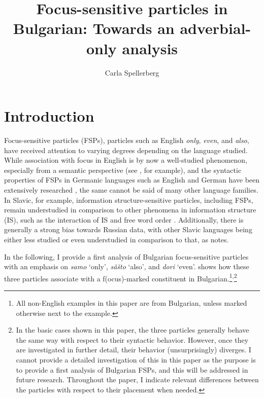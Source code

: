 \documentclass[output=paper,colorlinks,citecolor=brown]{langscibook}
\author{Carla Spellerberg %
\affiliation{University of Massachusetts, Amherst}}
\title[Focus-sensitive particles in Bulgarian]{Focus-sensitive particles in Bulgarian: Towards an adverbial-only analysis}
\begin{document}
\maketitle

%
\section{Introduction}\label{sec:1}
Focus-sensitive particles (FSPs), particles such as English \textit{only}, \textit{even}, and \textit{also}, have received attention to varying degrees depending on the language studied. While association with focus in English is by now a well-studied phenomenon, especially from a semantic perspective (see \citealt{spe:Rooth1985}, for example), and the syntactic properties of FSPs in Germanic languages such as English and German have been extensively researched \citep{Jacobs1983,BuringHartmann2001,vonStechow2008,Mursell2021}, the same cannot be said of many other language families. In Slavic, for example, information structure-sensitive particles, including FSPs, remain understudied in comparison to other phenomena in information structure (IS), such as the interaction of IS and free word order \citep[731]{Jasinskaja2016}. Additionally, there is generally a strong bias towards Russian data, with other Slavic languages being either less studied or even understudied in comparison to that, as \citet{Jasinskaja2016} notes. \par 
In the following, I provide a first analysis of Bulgarian focus-sensitive particles with an emphasis on \textit{samo} `only’, \textit{s\v{a}\v{s}to} `also’, and \textit{dori} `even’.  shows how these three particles associate with a f(ocus)-marked constituent in Bulgarian.\footnote{All non-English examples in this paper are from Bulgarian, unless marked otherwise next to the example.}\textsuperscript{,}\footnote{In the basic cases shown in this paper, the three particles generally behave the same way with respect to their syntactic behavior. However, once they are investigated in further detail, their behavior (unsurprisingly) diverges. I cannot provide a detailed investigation of this in this paper as the purpose is to provide a first analysis of Bulgarian FSPs, and this will be addressed in future research. Throughout the paper, I indicate relevant differences between the particles with respect to their placement when needed.}
\end{document}
